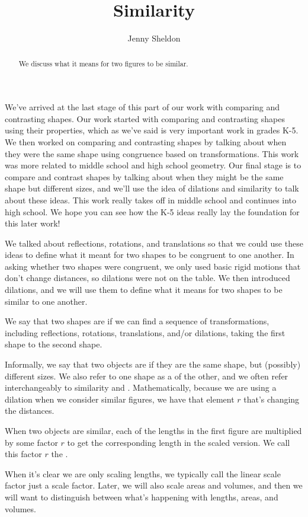\documentclass{ximera}
\title{Similarity}
\author{Jenny Sheldon}
\begin{document}
\begin{abstract}
We discuss what it means for two figures to be similar.
\end{abstract}
\maketitle

We've arrived at the last stage of this part of our work with comparing and contrasting shapes. Our work started with comparing and contrasting shapes using their properties, which as we've said is very important work in grades K-5. We then worked on comparing and contrasting shapes by talking about when they were the same shape using congruence based on transformations. This work was more related to middle school and high school geometry. Our final stage is to compare and contrast shapes by talking about when they might be the same shape but different sizes, and we'll use the idea of dilations and similarity to talk about these ideas. This work really takes off in middle school and continues into high school. We hope you can see how the K-5 ideas really lay the foundation for this later work!

We talked about reflections, rotations, and translations so that we could use these ideas to define what it meant for two shapes to be congruent to one another. In asking whether two shapes were congruent, we only used basic rigid motions that don't change distances, so dilations were not on the table. We then introduced dilations, and we will use them to define what it means for two shapes to be similar to one another.
\begin{definition}
We say that two shapes are  if we can find a sequence of transformations, including reflections, rotations, translations, and/or dilations, taking the first shape to the second shape.
\end{definition}
Informally, we say that two objects are  if they are the same shape, but (possibly) different sizes. We also refer to one shape as a  of the other, and we often refer interchangeably to similarity and . Mathematically, because we are using a dilation when we consider similar figures, we have that element $r$ that's changing the distances.
\begin{definition}
When two objects are similar, each of the lengths in the first figure are multiplied by some factor $r$ to get the corresponding length in the scaled version. We call this factor $r$ the .
\end{definition}
When it's clear we are only scaling lengths, we typically call the linear scale factor just a scale factor. Later, we will also scale areas and volumes, and then we will want to distinguish between what's happening with lengths, areas, and volumes.
\end{document}
